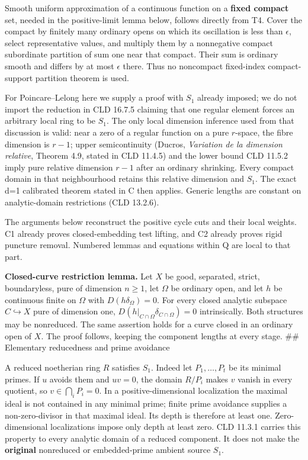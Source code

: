 \documentclass[
  10pt,
]{article}
\begin{document}
Smooth uniform approximation of a continuous function on a \textbf{fixed
compact} set, needed in the positive-limit lemma below, follows directly
from T4. Cover the compact by finitely many ordinary opens on which its
oscillation is less than \(\epsilon\), select representative values, and
multiply them by a nonnegative compact subordinate partition of sum one
near that compact. Their sum is ordinary smooth and differs by at most
\(\epsilon\) there. Thus no noncompact fixed-index compact-support
partition theorem is used.

For Poincare--Lelong here we supply a proof with \(S_1\) already
imposed; we do not import the reduction in CLD 16.7.5 claiming that one
regular element forces an arbitrary local ring to be \(S_1\). The only
local dimension inference used from that discussion is valid: near a
zero of a regular function on a pure \(r\)-space, the fibre dimension is
\(r-1\); upper semicontinuity (Ducros, \emph{Variation de la dimension
relative}, Theorem 4.9, stated in CLD 11.4.5) and the lower bound CLD
11.5.2 imply pure relative dimension \(r-1\) after an ordinary
shrinking. Every compact domain in that neighbourhood retains this
relative dimension and \(S_1\). The exact d=1 calibrated theorem stated
in C then applies. Generic lengths are constant on analytic-domain
restrictions (CLD 13.2.6).

The arguments below reconstruct the positive cycle cuts and their local
weights. C1 already proves closed-embedding test lifting, and C2 already
proves rigid puncture removal. Numbered lemmas and equations within Q
are local to that part.

\textbf{Closed-curve restriction lemma.} Let \(X\) be good, separated,
strict, boundaryless, pure of dimension \(n\geq1\), let \(\Omega\) be
ordinary open, and let \(h\) be continuous finite on \(\Omega\) with
\(D(h\delta_\Omega)=0\). For every closed analytic subspace
\(C\hookrightarrow X\) pure of dimension one,
\(D(h|_{C\cap\Omega}\delta_{C\cap\Omega})=0\) intrinsically. Both
structures may be nonreduced. The same assertion holds for a curve
closed in an ordinary open of \(X\). The proof follows, keeping the
component lengths at every stage. \#\# Elementary reducedness and prime
avoidance

A reduced noetherian ring \(R\) satisfies \(S_1\). Indeed let
\(P_1,\ldots,P_t\) be its minimal primes. If \(u\) avoids them and
\(uv=0\), the domain \(R/P_i\) makes \(v\) vanish in every quotient, so
\(v\in\bigcap_iP_i=0\). In a positive-dimensional localization the
maximal ideal is not contained in any minimal prime; finite prime
avoidance supplies a non-zero-divisor in that maximal ideal. Its depth
is therefore at least one. Zero-dimensional localizations impose only
depth at least zero. CLD 11.3.1 carries this property to every analytic
domain of a reduced component. It does not make the \textbf{original}
nonreduced or embedded-prime ambient source \(S_1\).
\end{document}
